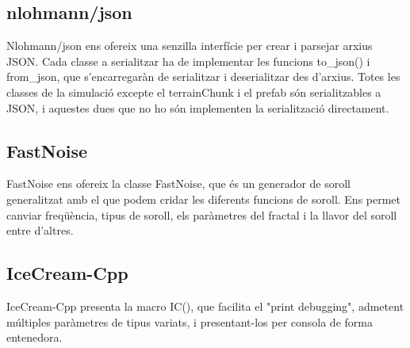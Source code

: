 \subsection{nlohmann/json}
Nlohmann/json ens ofereix una senzilla interfície per crear i parsejar arxius JSON. Cada classe a serialitzar ha de implementar les funcions to\_json() i from\_json, que s'encarregaràn de serialitzar i deserialitzar des d'arxius.
Totes les classes de la simulació excepte el terrainChunk i el prefab són serialitzables a JSON, i aquestes dues que no ho són implementen la serialització directament.
\subsection{FastNoise}
FastNoise ens ofereix la classe FastNoise, que és un generador de soroll generalitzat amb el que podem cridar les diferents funcions de soroll. Ens permet canviar freqüència, tipus de soroll, els paràmetres del fractal i la llavor del soroll entre d'altres.
\subsection{IceCream-Cpp}
IceCream-Cpp presenta la macro IC(), que facilita el "print debugging", admetent múltiples paràmetres de tipus variats, i presentant-los per consola de forma entenedora.

